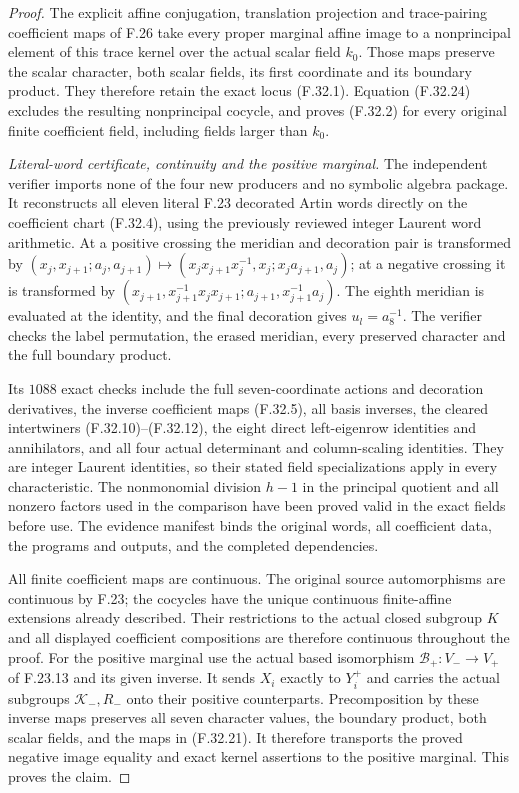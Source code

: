 \begin{proof}
The explicit affine conjugation,
translation projection and trace-pairing
coefficient maps of F.26 take every
proper marginal affine image to a
nonprincipal element of this trace
kernel over the actual scalar field
$k_0$. Those maps preserve the scalar
character, both scalar fields, its
first coordinate and its boundary
product. They therefore retain the
exact locus (F.32.1).
Equation (F.32.24) excludes the
resulting nonprincipal cocycle, and
proves (F.32.2) for every original
finite coefficient field, including
fields larger than $k_0$.

\emph{Literal-word certificate, continuity and the positive marginal.}
The independent verifier imports none
of the four new producers and no
symbolic algebra package. It reconstructs
all eleven literal F.23 decorated
Artin words directly on the coefficient
chart (F.32.4), using the previously
reviewed integer Laurent word arithmetic.
At a positive crossing the meridian
and decoration pair is transformed by
$(x_j,x_{j+1};a_j,a_{j+1})\mapsto
(x_jx_{j+1}x_j^{-1},x_j;x_ja_{j+1},a_j)$;
at a negative crossing it is transformed
by $(x_{j+1},x_{j+1}^{-1}x_jx_{j+1};
a_{j+1},x_{j+1}^{-1}a_j)$.
The eighth meridian is evaluated at
the identity, and the final decoration
gives $u_l=a_8^{-1}$.
The verifier checks the label permutation,
the erased meridian, every preserved
character and the full boundary product.

Its $1088$ exact checks include the
full seven-coordinate actions and
decoration derivatives, the inverse
coefficient maps (F.32.5), all basis
inverses, the cleared intertwiners
(F.32.10)--(F.32.12), the eight direct
left-eigenrow identities and annihilators,
and all four actual determinant and
column-scaling identities.
They are integer Laurent identities,
so their stated field specializations
apply in every characteristic.
The nonmonomial division $h-1$ in
the principal quotient and all nonzero
factors used in the comparison have
been proved valid in the exact fields
before use. The evidence manifest
binds the original words, all coefficient
data, the programs and outputs, and
the completed dependencies.

All finite coefficient maps are
continuous. The original source
automorphisms are continuous by F.23;
the cocycles have the unique continuous
finite-affine extensions already described.
Their restrictions to the actual
closed subgroup $K$ and all displayed
coefficient compositions are therefore
continuous throughout the proof.
For the positive marginal use the
actual based isomorphism
$\mathcal B_+:V_-\to V_+$ of F.23.13
and its given inverse. It sends $X_i$
exactly to $Y_i^+$ and carries the
actual subgroups $\mathcal K_-,R_-$
onto their positive counterparts.
Precomposition by these inverse maps
preserves all seven character values,
the boundary product, both scalar
fields, and the maps in (F.32.21).
It therefore transports the proved
negative image equality and exact
kernel assertions to the positive
marginal. This proves the claim.
\end{proof}
